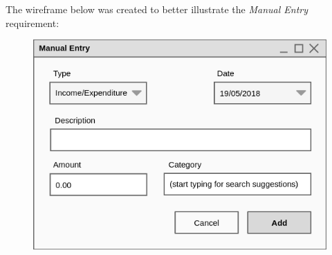 The wireframe below was created to better illustrate the \emph{Manual Entry} requirement:
\begin{figure}[ht!]
  \begin{center}
    \includegraphics[width=14cm]{./contents/img/Wireframe_-_Manual_Entry.png}
  \end{center}
\end{figure}
\FloatBarrier

